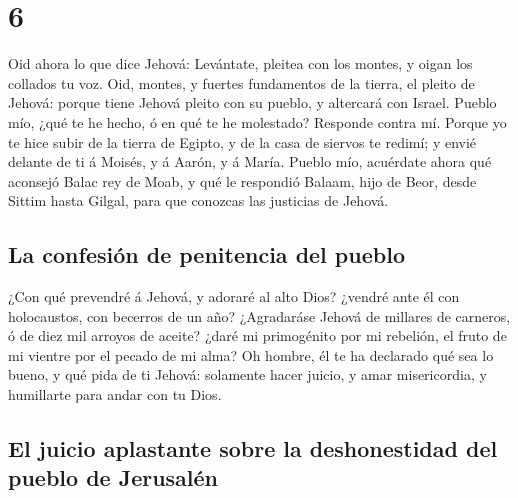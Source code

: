 \hypertarget{section-5}{%
\section{6}\label{section-5}}

 Oid ahora lo que dice Jehová: Levántate, pleitea con los
montes, y oigan los collados tu voz.  Oid, montes, y
fuertes fundamentos de la tierra, el pleito de Jehová: porque tiene
Jehová pleito con su pueblo, y altercará con Israel. 
Pueblo mío, ¿qué te he hecho, ó en qué te he molestado? Responde contra
mí.  Porque yo te hice subir de la tierra de Egipto, y de
la casa de siervos te redimí; y envié delante de ti á Moisés, y á Aarón,
y á María.  Pueblo mío, acuérdate ahora qué aconsejó Balac
rey de Moab, y qué le respondió Balaam, hijo de Beor, desde Sittim hasta
Gilgal, para que conozcas las justicias de Jehová.

\hypertarget{la-confesiuxf3n-de-penitencia-del-pueblo}{%
\subsection{La confesión de penitencia del
pueblo}\label{la-confesiuxf3n-de-penitencia-del-pueblo}}

 ¿Con qué prevendré á Jehová, y adoraré al alto Dios?
¿vendré ante él con holocaustos, con becerros de un año? 
¿Agradaráse Jehová de millares de carneros, ó de diez mil arroyos de
aceite? ¿daré mi primogénito por mi rebelión, el fruto de mi vientre por
el pecado de mi alma?  Oh hombre, él te ha declarado qué
sea lo bueno, y qué pida de ti Jehová: solamente hacer juicio, y amar
misericordia, y humillarte para andar con tu Dios.

\hypertarget{el-juicio-aplastante-sobre-la-deshonestidad-del-pueblo-de-jerusaluxe9n}{%
\subsection{El juicio aplastante sobre la deshonestidad del pueblo de
Jerusalén}\label{el-juicio-aplastante-sobre-la-deshonestidad-del-pueblo-de-jerusaluxe9n}}

